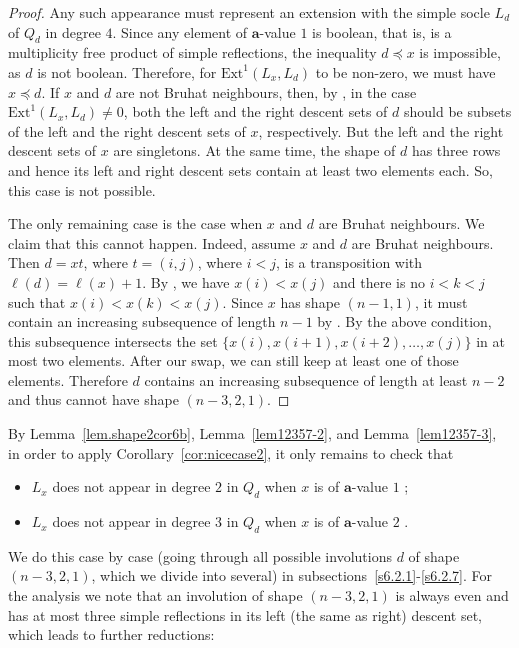 \documentclass[a4paper]{amsart}
\begin{document}
\begin{proof}
Any such appearance
must represent an extension with the simple socle $L_d$ of $Q_d$
in degree $4$. Since any element of $\mathbf{a}$-value $1$ is boolean,
that is, is a multiplicity free product of simple reflections, the inequality
$d\preceq x$ is impossible, as $d$ is not boolean. Therefore,
for $\mathrm{Ext}^1(L_x,L_d)$ to be non-zero, we must have
$x\preceq d$. If $x$ and $d$ are not Bruhat neighbours,
then, by \cite[Fact~3.2]{Wa}, in the case $\mathrm{Ext}^1(L_x,L_d)\neq 0$,
both the left and the right descent sets of $d$ should be subsets of
the left and the right descent sets of $x$, respectively.
But the left and the right descent sets of $x$ are singletons.
At the same time, the shape of $d$ has three rows and hence its
left and right descent sets contain at least two elements each.
So, this case is not possible.

The only remaining case is the case when $x$ and $d$ are Bruhat neighbours.
We claim that this cannot happen. Indeed, assume $x$ and $d$ are Bruhat
neighbours. Then $d=xt$, where $t=(i,j)$, where $i<j$, is a transposition with
$\ell(d)=\ell(x)+1$. By \cite[Lemma~2.1.4]{BB},  we have $x(i)<x(j)$
and there is no $i<k<j$ such that $x(i)<x(k)<x(j)$. Since $x$
has shape $(n-1,1)$, it must contain an increasing subsequence of
length $n-1$ by \cite{Sch}. By the above condition, this subsequence
intersects the set $\{x(i),x(i+1),x(i+2),\dots,x(j)\}$ in at most two elements.
After our swap, we can still keep at least one of those elements.
Therefore $d$ contains an increasing subsequence of length at least $n-2$
and thus cannot have shape $(n-3,2,1)$.
\end{proof}


By Lemma~\ref{lem.shape2cor6b}, Lemma~\ref{lem12357-2}, and Lemma~\ref{lem12357-3}, in order to apply Corollary~\ref{cor:nicecase2},
it only remains  to check that
\begin{itemize}
\item $L_x$ does not appear in degree $2$ in $Q_d$ when $x$ is of $\mathbf{a}$-value $1$ ;
\item $L_x$ does not appear in degree $3$ in $Q_d$ when $x$ is of $\mathbf{a}$-value $2$ .
\end{itemize}
We do this case by case (going through all possible involutions $d$ of shape $(n-3,2,1)$, which we divide into several) in subsections~\ref{s6.2.1}-\ref{s6.2.7}. For the analysis we note that
an involution of shape $(n-3,2,1)$ is always even and has at most three
simple reflections in its left (the same as right) descent set, which leads to further reductions:
\end{document}
